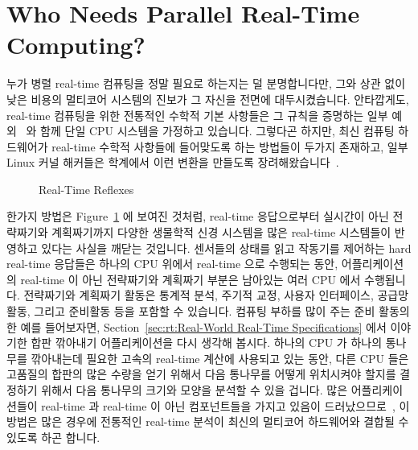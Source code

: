 \section{Who Needs Parallel Real-Time Computing?}
\label{sec:rt:Who Needs Parallel Real-Time Computing?}
누가 병렬 real-time 컴퓨팅을 정말 필요로 하는지는 덜 분명합니다만, 그와 상관
없이 낮은 비용의 멀티코어 시스템의 진보가 그 자신을 전면에 대두시켰습니다.
안타깝게도, real-time 컴퓨팅을 위한 전통적인 수학적 기본 사항들은 그 규칙을
증명하는 일부 예외~\cite{BjoernBrandenburgPhD} 와 함께 단일 CPU 시스템을
가정하고 있습니다.
그렇다곤 하지만, 최신 컴퓨팅 하드웨어가 real-time 수학적 사항들에 들어맞도록
하는 방법들이 두가지 존재하고, 일부 Linux 커널 해커들은 학계에서 이런 변환을
만들도록 장려해왔습니다~\cite{ThomasGleixner2010AcademiaVsReality}.

\begin{figure}[tb]
\centering
{}
\caption{Real-Time Reflexes}
\label{fig:rt:Real-Time Reflexes}
\end{figure}

한가지 방법은
Figure~\ref{fig:rt:Real-Time Reflexes} 에 보여진 것처럼, real-time 응답으로부터
실시간이 아닌 전략짜기와 계획짜기까지 다양한 생물학적 신경 시스템을 많은
real-time 시스템들이 반영하고 있다는 사실을 깨닫는 것입니다.
센서들의 상태를 읽고 작동기를 제어하는 hard real-time 응답들은 하나의 CPU
위에서 real-time 으로 수행되는 동안, 어플리케이션의 real-time 이 아닌
전략짜기와 계획짜기 부분은 남아있는 여러 CPU 에서 수행됩니다.
전략짜기와 계획짜기 활동은 통계적 분석, 주기적 교정, 사용자 인터페이스, 공급망
활동, 그리고 준비활동 등을 포함할 수 있습니다.
컴퓨팅 부하를 많이 주는 준비 활동의 한 예를 들어보자면,
Section~\ref{sec:rt:Real-World Real-Time Specifications} 에서 이야기한 합판
깎아내기 어플리케이션을 다시 생각해 봅시다.
하나의 CPU 가 하나의 통나무를 깎아내는데 필요한 고속의 real-time 계산에
사용되고 있는 동안, 다른 CPU 들은 고품질의 합판의 많은 수량을 얻기 위해서 다음
통나무를 어떻게 위치시켜야 할지를 결정하기 위해서 다음 통나무의 크기와 모양을
분석할 수 있을 겁니다.
많은 어플리케이션들이 real-time 과 real-time 이 아닌 컴포넌트들을 가지고 있음이
드러났으므로~\cite{RobertBerry2008IBMSysJ}, 이 방법은 많은 경우에 전통적인
real-time 분석이 최신의 멀티코어 하드웨어와 결합될 수 있도록 하곤 합니다.
\iffalse

